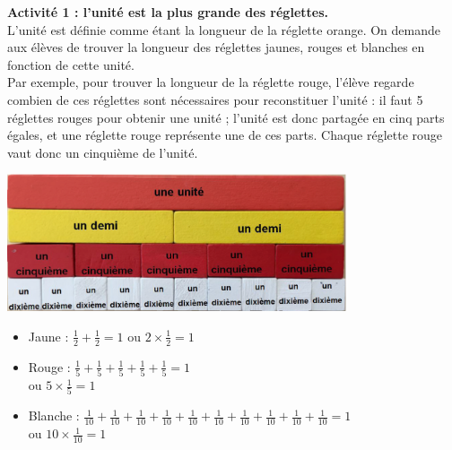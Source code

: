 \begin{exercice*}
{\bf Activité 1 : l'unité est la plus grande des réglettes.} \\
   L'unité est définie comme étant la longueur de la réglette orange. On demande aux élèves de trouver la longueur des réglettes jaunes, rouges et blanches en fonction de cette unité. \\
Par exemple, pour trouver la longueur de la réglette rouge, l’élève regarde combien de ces réglettes sont nécessaires pour reconstituer l’unité : il faut 5 réglettes rouges pour obtenir une unité ; l’unité est donc partagée en cinq parts égales, et une réglette rouge représente une de ces parts. Chaque réglette rouge vaut donc un cinquième de l'unité. \\ [2mm]
   \begin{minipage}{10cm}
            \includegraphics[width=10cm]{Nombres_et_calculs_did/Images/Num4_activites_Cuisenaire_A1}
   \end{minipage}
   \quad
   \begin{minipage}{6cm}
      \begin{itemize}
         \item Jaune : $\frac12+\frac12 =1$ ou $2\times\frac12 =1$ \medskip
         \item Rouge : $\frac15+\frac15+\frac15+\frac15+\frac15 =1$ \\ [1mm] ou  $5\times\frac15 =1$ \medskip
         \item Blanche : $\frac1{10}+\frac1{10}+\frac1{10}+\frac1{10}+\frac1{10}+\frac1{10}+\frac1{10}+\frac1{10}+\frac1{10}+\frac1{10} =1$  \\ [1mm] ou $10\times\frac1{10} =1$
      \end{itemize}
   \end{minipage}
   
   \bigskip
   

\end{exercice*}
